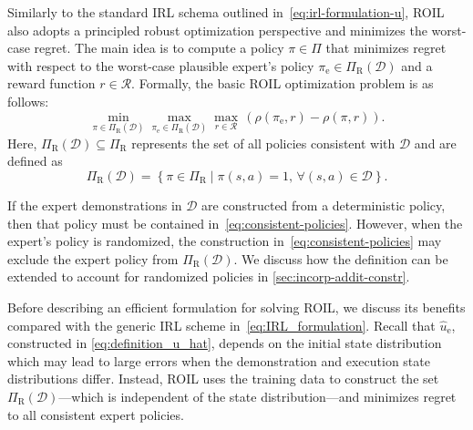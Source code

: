 \documentclass[10pt]{article}
\theoremstyle{plain}
\theoremstyle{remark}
\begin{document}
Similarly to the standard IRL schema outlined in~\eqref{eq:irl-formulation-u}, ROIL also adopts a principled robust optimization perspective and minimizes the worst-case regret.  The main idea is to compute a policy $\pi\in \Pi$ that minimizes regret with respect to the worst-case plausible expert's policy $\pi_{\mathrm{e}} \in \Pi_{\mathrm{R}}(\mathcal{D})$ and a reward function $r\in \mathcal{R}$. Formally, the basic ROIL optimization problem is as follows:
\begin{equation}
\label{eq:robust_IRL_formulation}
\min_{\pi \in \Pi_{\mathrm{R}}(\mathcal{D})}  \max_{\pi_{\mathrm{e}} \in \Pi_{\mathrm{R}}(\mathcal{D})} \max_{r \in \mathcal{R}} \,
\left(\rho(\pi_{\mathrm{e}}, r) - \rho(\pi, r)\right).
\end{equation}
Here, $ \Pi_{\mathrm{R}}(\mathcal{D}) \subseteq \Pi_{\mathrm{R}}$ represents the set of all policies consistent with $\mathcal{D}$ and are defined as 
%
\begin{equation} \label{eq:consistent-policies}
\Pi_{\mathrm{R}}(\mathcal{D}) = \left\{ \pi \in \Pi_{\mathrm{R}} \mid \pi(s,a) = 1, \, \forall (s,a) \in \mathcal{D} \right\}.
\end{equation}

If the expert demonstrations in $\mathcal{D}$ are constructed from a deterministic policy, then that policy must be contained in~\eqref{eq:consistent-policies}. However, when the expert's policy is randomized, the construction in~\eqref{eq:consistent-policies} may exclude the expert policy from $\Pi_{\mathrm{R}}(\mathcal{D})$. We discuss how the definition can be extended to account for randomized policies in \cref{sec:incorp-addit-constr}. 

Before describing an efficient formulation for solving ROIL, we discuss its benefits compared with the generic IRL scheme in~\eqref{eq:IRL_formulation}. Recall that $\hat{u}_{\mathrm{e}}$, constructed in \eqref{eq:definition_u_hat},  depends on the initial state distribution which may lead to large errors when the demonstration and execution state distributions differ. Instead, ROIL uses the training data to construct the set $\Pi_{\mathrm{R}}(\mathcal{D})$---which is independent of the state distribution---and minimizes regret to all consistent expert policies. 
\end{document}
